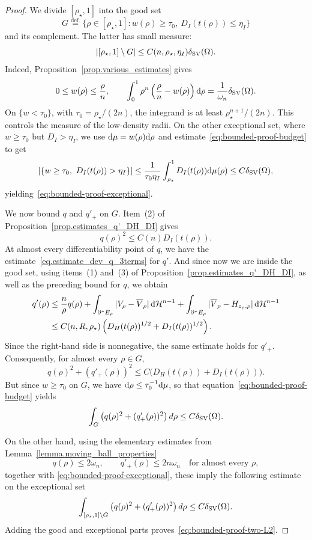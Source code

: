 \documentclass[11pt]{amsart}
\theoremstyle{plain}
\theoremstyle{definition}
\newcommand{\dHn}{\,\dd\mathcal{H}^{n-1}}
\newcommand{\eqdef}{\overset{\text{def.}}{=}}
\def\dd{{\rm d}}
\newcommand\SV{\mathop{\rm SV}}
\begin{document}
\begin{proof}
We divide $[\rho_\star,1]$ into the good set
\[
 G\eqdef\{\rho\in[\rho_\star,1]:
 w(\rho)\ge\tau_0,\ D_I(t(\rho))\le\eta_I\}
\]
and its complement.  The latter has small measure:
\begin{equation}\label{eq:bounded-proof-exceptional}
 |[\rho_\star,1]\setminus G|
 \le C(n,\rho_\star,\eta_I)\delta_{\SV}(\Omega).
\end{equation}
Indeed, Proposition~\ref{prop.various_estimates} gives
\[
 0\le w(\rho)\le\frac{\rho}{n},
 \qquad
 \int_0^1\rho^n\left(\frac{\rho}{n}-w(\rho)\right)\dd\rho
 =\frac{1}{\omega_n}\delta_{\SV}(\Omega).
\]
On $\{w<\tau_0\}$, with $\tau_0=\rho_\star/(2n)$, the integrand is at
least $\rho_\star^{n+1}/(2n)$.  This controls the measure of the low-density
radii.  On the other exceptional set, where $w\ge\tau_0$ but
$D_I>\eta_I$, we use $\dd\mu=w(\rho)\dd\rho$ and estimate~\eqref{eq:bounded-proof-budget} to get
\[
 |\{w\ge\tau_0,\ D_I(t(\rho))>\eta_I\}|
 \le\frac{1}{\tau_0\eta_I}
 \int_{\rho_\star}^1D_I(t(\rho))\dd\mu(\rho)
 \le C\delta_{\SV}(\Omega),
\]
yielding~\eqref{eq:bounded-proof-exceptional}.

We now bound $q$ and $q'_+$ on $G$.   Item~(2) of
Proposition~\ref{prop.estimates_q'_DH_DI} gives
\[
 q(\rho)^2\le C(n)D_I(t(\rho)).
\]
At almost every differentiability point of $q$, we have the estimate~\eqref{eq.estimate_dev_q_3terms} for $q'$. And since now we are inside the good set, using items~(1) and~(3) of Proposition~\ref{prop.estimates_q'_DH_DI}, as
well as the preceding bound for $q$, we obtain
\begin{align*}
 q'(\rho)
 &\le\frac{n}{\rho} q(\rho)
 +\int_{\partial^*E_\rho}|V_\rho-\overline V_\rho|\dHn
 +\int_{\partial^*E_\rho}
       |\overline V_\rho-H_{z_\rho,\rho}|\dHn\\
 &\le C(n,R,\rho_\star)
 \left(D_H(t(\rho))^{1/2}+D_I(t(\rho))^{1/2}\right).
\end{align*}
Since the right-hand side is nonnegative, the same estimate holds for
$q'_+$. Consequently, for almost every $\rho\in G$,
\begin{equation}\label{eq:bounded-proof-good-radius}
 q(\rho)^2+(q'_+(\rho))^2
 \le C\bigl(D_H(t(\rho))+D_I(t(\rho))\bigr).
\end{equation}
But since $w\ge\tau_0$ on $G$, we have $\dd\rho\le\tau_0^{-1}\dd\mu$, so that equation~\eqref{eq:bounded-proof-budget} yields
\[
 \int_G\left(q(\rho)^2+(q'_+(\rho))^2\right)d\rho
 \le C\delta_{\SV}(\Omega).
\]

On the other hand, using the elementary estimates from Lemma~\ref{lemma.moving_ball_properties}
 \[
 q(\rho)\le2\omega_n,
 \qquad q'_+(\rho)\le2n\omega_n
 \quad\text{for almost every }\rho,
 \]
together with \eqref{eq:bounded-proof-exceptional}, these imply the following estimate on the exceptional set
 \[
 \int_{[\rho_\star,1]\setminus G}
 \left(q(\rho)^2+(q'_+(\rho))^2\right)d\rho
 \le C\delta_{\SV}(\Omega).
 \]
Adding the good and exceptional parts proves~\eqref{eq:bounded-proof-two-L2}.


\end{proof}
\end{document}
